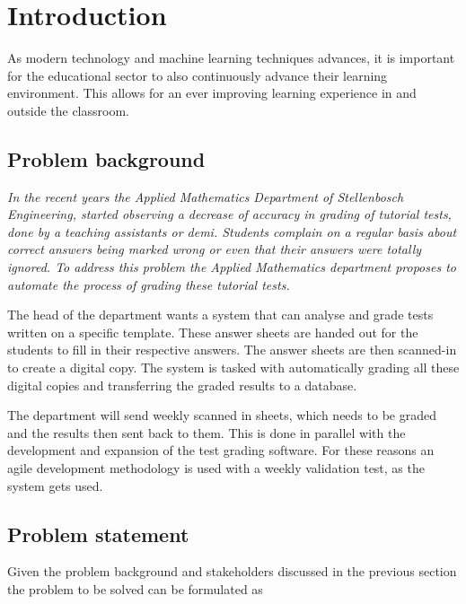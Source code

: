 \chapter{Introduction}
\label{ch:Introduction}
\graphicspath{{Chapter1/Chapter1Figures/}}

As modern technology and machine learning techniques advances, it is important for the educational sector to also continuously advance their learning environment. This allows for an ever improving learning experience in and outside the classroom. 

\section{Problem background}

\textsl{In the recent years the Applied Mathematics Department of Stellenbosch Engineering, started observing a decrease of accuracy in grading of tutorial tests, done by a teaching assistants or demi. Students complain on a regular basis about correct answers being marked wrong or even that their answers were totally ignored. To address this problem the Applied Mathematics department proposes to automate the process of grading these tutorial tests.}

The head of the department wants a system that can analyse and grade tests written on a specific template. These answer sheets are handed out for the students to fill in their respective answers. The answer sheets are then scanned-in to create a digital copy. The system is tasked with automatically grading all these digital copies and transferring the graded results to a database.

The department will send weekly scanned in sheets, which needs to be graded and the results then sent back to them. This is done in parallel with the development and expansion of the test grading software. For these reasons an agile development methodology is used with a weekly validation test, as the system gets used. 

\section{Problem statement}
\label{sec:problemStatement}

Given the problem background and stakeholders discussed in the previous section the problem to be solved can be formulated as
\newline
\newline
\noindent{}

